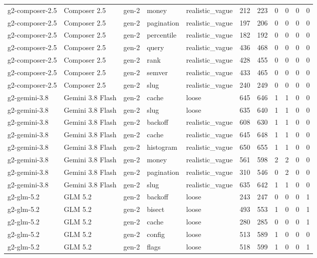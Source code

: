 \begin{tabular}{lllllllllll}
g2-composer-2.5 & Composer 2.5 & gen-2 & money & realistic\_vague & 212 & 223 & 0 & 0 & 0 & 0 \\
g2-composer-2.5 & Composer 2.5 & gen-2 & pagination & realistic\_vague & 197 & 206 & 0 & 0 & 0 & 0 \\
g2-composer-2.5 & Composer 2.5 & gen-2 & percentile & realistic\_vague & 182 & 192 & 0 & 0 & 0 & 0 \\
g2-composer-2.5 & Composer 2.5 & gen-2 & query & realistic\_vague & 436 & 468 & 0 & 0 & 0 & 0 \\
g2-composer-2.5 & Composer 2.5 & gen-2 & rank & realistic\_vague & 428 & 455 & 0 & 0 & 0 & 0 \\
g2-composer-2.5 & Composer 2.5 & gen-2 & semver & realistic\_vague & 433 & 465 & 0 & 0 & 0 & 0 \\
g2-composer-2.5 & Composer 2.5 & gen-2 & slug & realistic\_vague & 240 & 249 & 0 & 0 & 0 & 0 \\
g2-gemini-3.8 & Gemini 3.8 Flash & gen-2 & cache & loose & 645 & 646 & 1 & 1 & 0 & 0 \\
g2-gemini-3.8 & Gemini 3.8 Flash & gen-2 & slug & loose & 635 & 640 & 1 & 1 & 0 & 0 \\
g2-gemini-3.8 & Gemini 3.8 Flash & gen-2 & backoff & realistic\_vague & 608 & 630 & 1 & 1 & 0 & 0 \\
g2-gemini-3.8 & Gemini 3.8 Flash & gen-2 & cache & realistic\_vague & 645 & 648 & 1 & 1 & 0 & 0 \\
g2-gemini-3.8 & Gemini 3.8 Flash & gen-2 & histogram & realistic\_vague & 650 & 655 & 1 & 1 & 0 & 0 \\
g2-gemini-3.8 & Gemini 3.8 Flash & gen-2 & money & realistic\_vague & 561 & 598 & 2 & 2 & 0 & 0 \\
g2-gemini-3.8 & Gemini 3.8 Flash & gen-2 & pagination & realistic\_vague & 310 & 546 & 0 & 2 & 0 & 0 \\
g2-gemini-3.8 & Gemini 3.8 Flash & gen-2 & slug & realistic\_vague & 635 & 642 & 1 & 1 & 0 & 0 \\
g2-glm-5.2 & GLM 5.2 & gen-2 & backoff & loose & 243 & 247 & 0 & 0 & 0 & 1 \\
g2-glm-5.2 & GLM 5.2 & gen-2 & bisect & loose & 493 & 553 & 1 & 0 & 0 & 1 \\
g2-glm-5.2 & GLM 5.2 & gen-2 & cache & loose & 280 & 285 & 0 & 0 & 0 & 1 \\
g2-glm-5.2 & GLM 5.2 & gen-2 & config & loose & 513 & 589 & 1 & 0 & 0 & 0 \\
g2-glm-5.2 & GLM 5.2 & gen-2 & flags & loose & 518 & 599 & 1 & 0 & 0 & 1 \\

\end{tabular}
